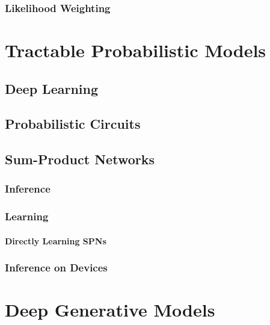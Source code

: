 		\subsection{Likelihood Weighting} %

\chapter{Tractable Probabilistic Models} %

	\section{Deep Learning} %

	\section{Probabilistic Circuits} %

	\section{Sum-Product Networks} %

		\subsection{Inference} %

		\subsection{Learning} %

			\subsubsection{Directly Learning SPNs} %

		\subsection{Inference on Devices} %

\chapter{Deep Generative Models} %

